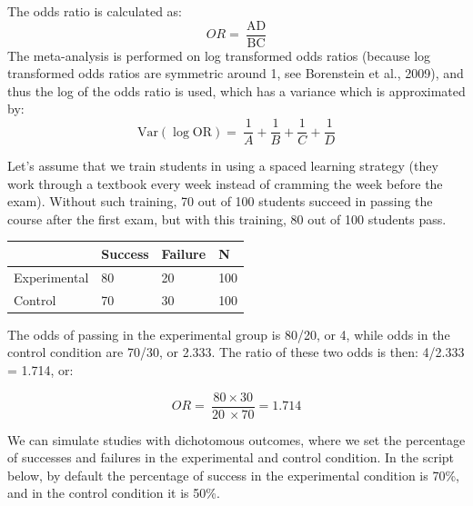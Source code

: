 \documentclass[
  oneside]{krantz}
\begin{document}
The odds ratio is calculated as:
\[OR = \ \frac{\text{AD}}{\text{BC}}\]
The meta-analysis is performed on log transformed odds ratios (because log transformed odds ratios are symmetric around 1, see Borenstein et al., 2009), and thus the log of the odds ratio is used, which has a variance which is approximated by:
\[\text{Var}\left( \log\text{OR} \right) = \ \frac{1}{A} + \frac{1}{B} + \frac{1}{C} + \frac{1}{D}\]

Let's assume that we train students in using a spaced learning strategy (they work through a textbook every week instead of cramming the week before the exam). Without such training, 70 out of 100 students succeed in passing the course after the first exam, but with this training, 80 out of 100 students
pass.

\begin{longtable}[]{@{}llll@{}}
\toprule()
& Success & Failure & N \\
\midrule()
\endhead
Experimental & 80 & 20 & 100 \\
Control & 70 & 30 & 100 \\
\bottomrule()
\end{longtable}

The odds of passing in the experimental group is 80/20, or 4, while odds in the control condition are 70/30, or 2.333. The ratio of these two odds is then: 4/2.333 = 1.714, or:

\[
OR = \ \frac{80 \times 30}{20\  \times 70} = 1.714
\]

We can simulate studies with dichotomous outcomes, where we set the percentage of successes and
failures in the experimental and control condition. In the script below, by default the percentage of success in the experimental condition is 70\%, and in the control condition it is 50\%.
\end{document}
